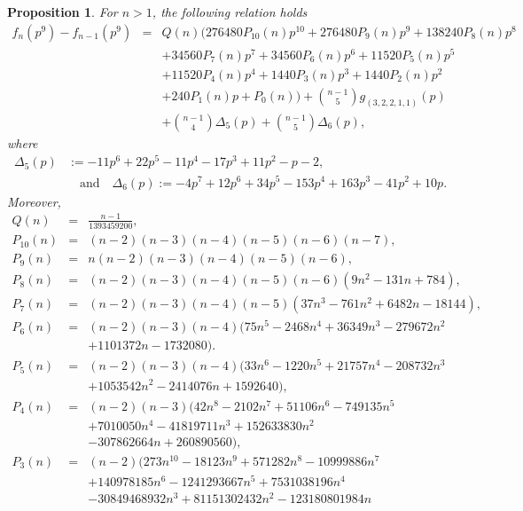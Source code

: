 \documentclass[a4paper]{amsart}
\newtheorem{proposition}[theorem]{Proposition}
\numberwithin{equation}{section}
\theoremstyle{remark}
\begin{document}
\begin{proposition}\label{mainprop}
For $n > 1$, the following relation holds
\vspace{-0.2 em}
\begin{eqnarray*}
    f_{n}(p^9) - f_{n-1}(p^9) & = & Q(n)(276480P_{10}(n)p^{10} + 276480P_{9}(n)p^{9} + 138240P_{8}(n)p^{8}\\
    & & + 34560P_{7}(n)p^{7} + 34560P_{6}(n)p^{6} + 11520P_{5}(n)p^{5}\\
    & & + 11520P_{4}(n)p^{4} + 1440P_{3}(n)p^{3} + 1440P_{2}(n)p^{2}\\
    & & + 240P_{1}(n)p + P_{0}(n)) + {n-1 \choose 5}g_{(3,2,2,1,1)}(p)\\
    & & + {n-1 \choose 4}\Delta_5(p)+{n-1 \choose 5}\Delta_6(p),
\end{eqnarray*}
where
\[\begin{aligned}
\Delta_5(p)&:=-11p^6+22p^5-11p^4-17p^3+11p^2-p-2,\\
&\quad\text{and}\quad
\Delta_6(p):=-4p^7+12p^6+34p^5-153p^4+163p^3-41p^2+10p.
\end{aligned}\]
Moreover,
\begin{eqnarray*}
    Q(n) &=& \frac{n-1}{1393459200},\\
    P_{10}(n) &=& (n - 2)(n - 3)(n - 4)(n - 5)(n - 6)(n - 7),\\
    P_9(n) &=& n(n - 2)(n - 3)(n - 4)(n - 5)(n - 6),\\
    P_8(n) &=& (n - 2)(n - 3)(n - 4)(n - 5)(n - 6)(9n^2 - 131n + 784),\\
    P_7(n) &=& (n - 2)(n - 3)(n - 4)(n - 5)(37n^3 - 761n^2 + 6482n - 18144),\\
    P_6(n) &=& (n - 2)(n - 3)(n - 4)(75n^5 - 2468n^4 + 36349n^3 - 279672n^2\\
    && + 1101372n - 1732080).\\
    P_5(n) &=& (n - 2)(n - 3)(n - 4)(33n^6 - 1220n^5 + 21757n^4 - 208732n^3\\
    && + 1053542n^2 - 2414076n + 1592640),\\
    P_4(n) &=& (n - 2)(n - 3)(42n^8 - 2102n^7 + 51106n^6 - 749135n^5\\
    && + 7010050n^4 - 41819711n^3 + 152633830n^2\\
    && - 307862664n + 260890560),\\
    P_3(n) &=& (n - 2)(273n^{10} - 18123n^9 + 571282n^8 - 10999886n^7\\
    && + 140978185n^6 - 1241293667n^5 + 7531038196n^4\\
    && - 30849468932n^3 + 81151302432n^2 - 123180801984n\\

\end{eqnarray*}
\end{proposition}
\end{document}

